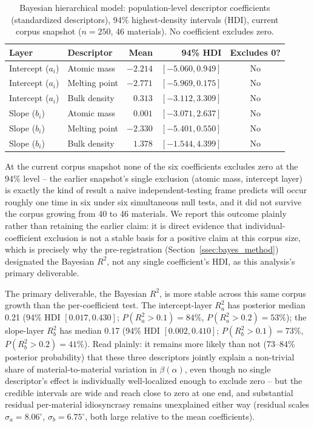 \documentclass[aip,amsmath,amssymb,reprint]{revtex4-1}
\begin{document}
\begin{table}[htbp]
  \centering
  \caption{Bayesian hierarchical model: population-level descriptor
    coefficients (standardized descriptors), 94\% highest-density
    intervals (HDI), current corpus snapshot ($n=250$, 46 materials).
    No coefficient excludes zero.}
  \label{tab:bayes_coef}
  \begin{tabular}{llrrc}
    \toprule
    Layer & Descriptor & Mean & 94\% HDI & Excludes 0? \\
    \midrule
    Intercept ($a_i$) & Atomic mass    & $-2.214$ & $[-5.060, 0.949]$ & No \\
    Intercept ($a_i$) & Melting point  & $-2.771$ & $[-5.969, 0.175]$ & No \\
    Intercept ($a_i$) & Bulk density   & $ 0.313$ & $[-3.112, 3.309]$ & No \\
    Slope ($b_i$)      & Atomic mass    & $ 0.001$ & $[-3.071, 2.637]$ & No \\
    Slope ($b_i$)      & Melting point  & $-2.330$ & $[-5.401, 0.550]$ & No \\
    Slope ($b_i$)      & Bulk density   & $ 1.378$ & $[-1.544, 4.399]$ & No \\
    \bottomrule
  \end{tabular}
\end{table}

At the current corpus snapshot none of the six coefficients excludes
zero at the 94\% level -- the earlier snapshot's single exclusion
(atomic mass, intercept layer) is exactly the kind of result a naive
independent-testing frame predicts will occur roughly one time in six
under six simultaneous null tests, and it did not survive the corpus
growing from 40 to 46 materials. We report this outcome plainly rather
than retaining the earlier claim: it is direct evidence that
individual-coefficient exclusion is not a stable basis for a positive
claim at this corpus size, which is precisely why the pre-registration
(Section~\ref{ssec:bayes_method}) designated the Bayesian $R^2$, not
any single coefficient's HDI, as this analysis's primary deliverable.

The primary deliverable, the Bayesian $R^2$, is more stable across this
same corpus growth than the per-coefficient test. The intercept-layer
$R^2_a$ has posterior median 0.21 (94\% HDI
$[0.017,0.430]$; $P(R^2_a>0.1)=84\%$, $P(R^2_a>0.2)=53\%$); the
slope-layer $R^2_b$ has median 0.17 (94\% HDI $[0.002,0.410]$;
$P(R^2_b>0.1)=73\%$, $P(R^2_b>0.2)=41\%$). Read plainly: it remains
more likely than not (73--84\% posterior probability) that these three
descriptors jointly explain a non-trivial share of material-to-material
variation in $\beta(\alpha)$, even though no single descriptor's effect
is individually well-localized enough to exclude zero -- but the
credible intervals are wide and reach close to zero at one end, and
substantial residual per-material idiosyncrasy remains unexplained
either way (residual scales $\sigma_a=8.06^{\circ}$,
$\sigma_b=6.75^{\circ}$, both large relative to the mean coefficients).
\end{document}
